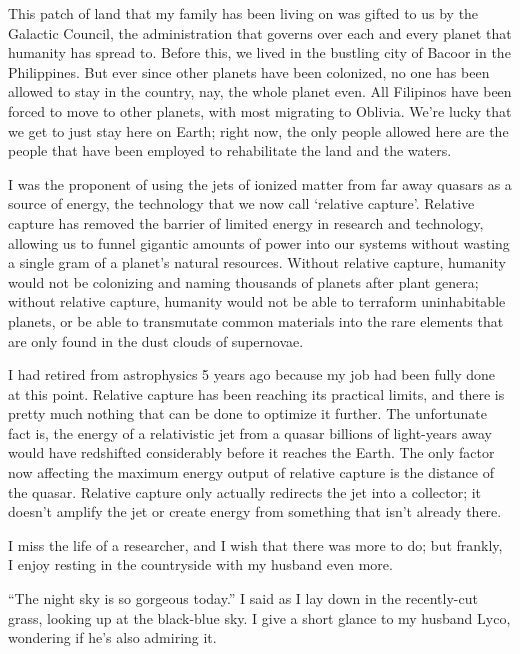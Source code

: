 \documentclass{book}
\begin{document}
			This patch of land that my family has been living on was gifted to us by the Galactic
			Council, the administration that governs over each and every planet that humanity has
			spread to. Before this, we lived in the bustling city of Bacoor in the Philippines. But
			ever since other planets have been colonized, no one has been allowed to stay in the country,
			nay, the whole planet even. All Filipinos have been forced to move to other planets, with
			most migrating to Oblivia. We're lucky that we get to just stay here on Earth; right now,
			the only people allowed here are the people that have been employed to rehabilitate the land and the waters.

			I was the proponent of using the jets of ionized matter from far away quasars as
			a source of energy, the technology that we now call `relative capture'. Relative
			capture has removed the barrier of limited energy in research and technology, allowing us to
			funnel gigantic amounts of power into our systems without wasting a single
			gram of a planet's natural resources. Without relative capture, humanity would not be
			colonizing and naming thousands of planets after plant genera; without relative
			capture, humanity would not be able to terraform uninhabitable planets, or be able to
			transmutate common materials into the rare elements that are only found in the dust clouds of
			supernovae.

			I had retired from astrophysics 5 years ago because my job had been fully done at this
			point. Relative capture has been reaching its practical limits, and there is pretty
			much nothing that can be done to optimize it further. The unfortunate fact is, the energy
			of a relativistic jet from a quasar billions of light-years away would have redshifted considerably before it
			reaches the Earth. The only factor now affecting the maximum energy output of relative capture
			is the distance of the quasar. Relative capture only actually redirects the jet into a collector;
			it doesn't amplify the jet or create energy from something that isn't already there.

			I miss the life of a researcher, and I wish that there was more to do; but frankly, I
			enjoy resting in the countryside with my husband even more.

			``The night sky is so gorgeous today.'' I said as I lay down in the recently-cut grass,
			looking up at the black-blue sky. I give a short glance to my husband Lyco, wondering
			if he's also admiring it.
\end{document}
